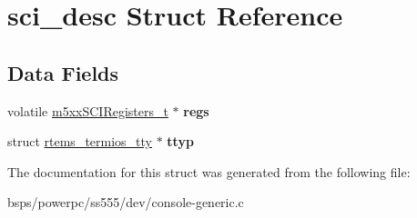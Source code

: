 \hypertarget{structsci__desc}{}\section{sci\+\_\+desc Struct Reference}
\label{structsci__desc}
\subsection*{Data Fields}
\begin{DoxyCompactItemize}
\item 
\mbox{\label{structsci__desc_a00e415c46aec8954dab36bf4cd26e07f}} 
volatile \mbox{\hyperlink{structm5xxSCIRegisters__}{m5xx\+S\+C\+I\+Registers\+\_\+t}} $\ast$ {\bfseries regs}
\item 
\mbox{\label{structsci__desc_a02f4797c50fe15e6d7a0e6d43e5acd4f}} 
struct \mbox{\hyperlink{structrtems__termios__tty}{rtems\+\_\+termios\+\_\+tty}} $\ast$ {\bfseries ttyp}
\end{DoxyCompactItemize}


The documentation for this struct was generated from the following file\+:\begin{DoxyCompactItemize}
\item 
bsps/powerpc/ss555/dev/console-\/generic.\+c\end{DoxyCompactItemize}
